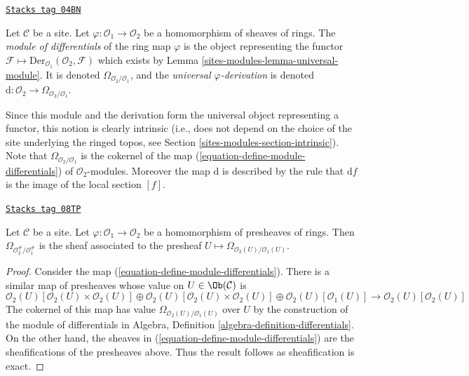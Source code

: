 \begin{definition}
\label{sites-modules-definition-module-differentials}
\href{https://stacks.math.columbia.edu/tag/04BN}{\texttt{Stacks tag 04BN}}

Let $\mathcal{C}$ be a site. Let $\varphi : \mathcal{O}_1 \to \mathcal{O}_2$
be a homomorphism of sheaves of rings. The {\it module of differentials}
of the ring map $\varphi$ is the object representing the functor
$\mathcal{F} \mapsto \text{Der}_{\mathcal{O}_1}(\mathcal{O}_2, \mathcal{F})$
which exists by Lemma \ref{sites-modules-lemma-universal-module}.
It is denoted $\Omega_{\mathcal{O}_2/\mathcal{O}_1}$, and the {\it universal
$\varphi$-derivation} is denoted
$\text{d} : \mathcal{O}_2 \to \Omega_{\mathcal{O}_2/\mathcal{O}_1}$.
\end{definition}

Since this module and the derivation form the universal object representing
a functor, this notion is clearly intrinsic (i.e., does not depend
on the choice of the site underlying the ringed topos, see
Section \ref{sites-modules-section-intrinsic}).
Note that $\Omega_{\mathcal{O}_2/\mathcal{O}_1}$ is the cokernel of
the map (\ref{equation-define-module-differentials}) of
$\mathcal{O}_2$-modules. Moreover the map $\text{d}$ is described
by the rule that $\text{d}f$ is the image of the local section $[f]$.

\begin{lemma}
\label{sites-modules-lemma-differentials-sheafify}
\href{https://stacks.math.columbia.edu/tag/08TP}{\texttt{Stacks tag 08TP}}

Let $\mathcal{C}$ be a site. Let $\varphi : \mathcal{O}_1 \to \mathcal{O}_2$
be a homomorphism of presheaves of rings. Then
$\Omega_{\mathcal{O}_2^\#/\mathcal{O}_1^\#}$ is the sheaf associated to the
presheaf $U \mapsto \Omega_{\mathcal{O}_2(U)/\mathcal{O}_1(U)}$.
\end{lemma}

\begin{proof}
Consider the map (\ref{equation-define-module-differentials}). There is
a similar map of presheaves whose value on $U \in \Ob(\mathcal{C})$ is
$$
\mathcal{O}_2(U)[\mathcal{O}_2(U) \times \mathcal{O}_2(U)] \oplus
\mathcal{O}_2(U)[\mathcal{O}_2(U) \times \mathcal{O}_2(U)] \oplus
\mathcal{O}_2(U)[\mathcal{O}_1(U)]
\longrightarrow
\mathcal{O}_2(U)[\mathcal{O}_2(U)]
$$
The cokernel of this map has value $\Omega_{\mathcal{O}_2(U)/\mathcal{O}_1(U)}$
over $U$ by the construction of the module of differentials in
Algebra, Definition \ref{algebra-definition-differentials}.
On the other hand, the sheaves in (\ref{equation-define-module-differentials})
are the sheafifications of the presheaves above. Thus the result follows
as sheafification is exact.
\end{proof}

